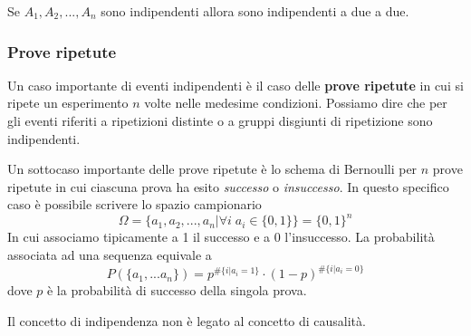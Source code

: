 \begin{observation}
	Se $A_1, A_2, ..., A_n$ sono indipendenti allora sono indipendenti a due a due.
\end{observation}

\subsubsection{Prove ripetute}
Un caso importante di eventi indipendenti è il caso delle \textbf{prove ripetute} in cui si ripete
un esperimento $n$ volte nelle medesime condizioni. Possiamo dire che per gli eventi riferiti a
ripetizioni distinte o a gruppi disgiunti di ripetizione sono indipendenti.

Un sottocaso importante delle prove ripetute è lo schema di Bernoulli per $n$ prove ripetute in
cui ciascuna prova ha esito \emph{successo} o \emph{insuccesso}. In questo specifico caso è
possibile scrivere lo spazio campionario
\[ \Omega = \{ a_1, a_2, ..., a_n | \forall i \; a_i \in \{ 0, 1 \} \} = \{ 0, 1 \}^n \]
In cui associamo tipicamente a 1 il successo e a 0 l'insuccesso. La probabilità associata ad una
sequenza equivale a
\[ P(\{ a_1, ... a_n \}) = p^{\# \{i | a_i = 1\}} \cdot (1 - p)^{\# \{i | a_i = 0\}}  \]
dove $p$ è la probabilità di successo della singola prova.

\begin{observation}
	Il concetto di indipendenza non è legato al concetto di causalità.
\end{observation}
